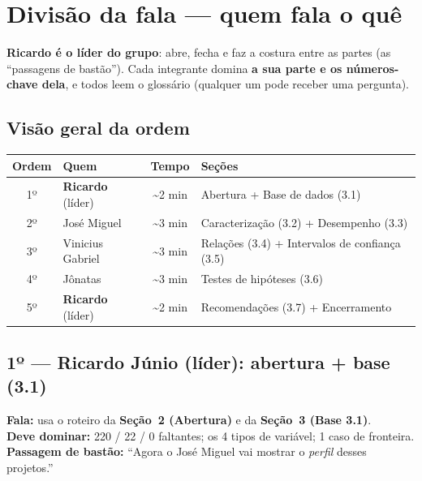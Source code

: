 \documentclass[a4paper, 11pt]{article}
\begin{document}
\section{Divisão da fala --- quem fala o quê}
\label{sec:divisao}

\begin{fala}
\textbf{Ricardo é o líder do grupo}: abre, fecha e faz a costura entre as partes (as
``passagens de bastão''). Cada integrante domina \textbf{a sua parte e os números-chave dela}, e
todos leem o glossário (qualquer um pode receber uma pergunta).
\end{fala}

\subsection*{Visão geral da ordem}

\begin{table}[H]
\centering
\begin{tabularx}{\textwidth}{@{} c l c L @{}}
\toprule
\textbf{Ordem} & \textbf{Quem} & \textbf{Tempo} & \textbf{Seções} \\
\midrule
1º & \textbf{Ricardo} (líder) & \textasciitilde2 min & Abertura + Base de dados (3.1) \\
2º & José Miguel             & \textasciitilde3 min & Caracterização (3.2) + Desempenho (3.3) \\
3º & Vinicius Gabriel        & \textasciitilde3 min & Relações (3.4) + Intervalos de confiança (3.5) \\
4º & Jônatas                 & \textasciitilde3 min & Testes de hipóteses (3.6) \\
5º & \textbf{Ricardo} (líder) & \textasciitilde2 min & Recomendações (3.7) + Encerramento \\
\bottomrule
\end{tabularx}
\end{table}

\subsection*{1º --- Ricardo Júnio (líder): abertura + base (3.1)}
\textbf{Fala:} usa o roteiro da \textbf{Seção~2 (Abertura)} e da \textbf{Seção~3 (Base 3.1)}.\\
\textbf{Deve dominar:} 220 / 22 / 0 faltantes; os 4 tipos de variável; 1 caso de fronteira.\\
\textbf{Passagem de bastão:} ``Agora o José Miguel vai mostrar o \emph{perfil} desses projetos.''
\end{document}
